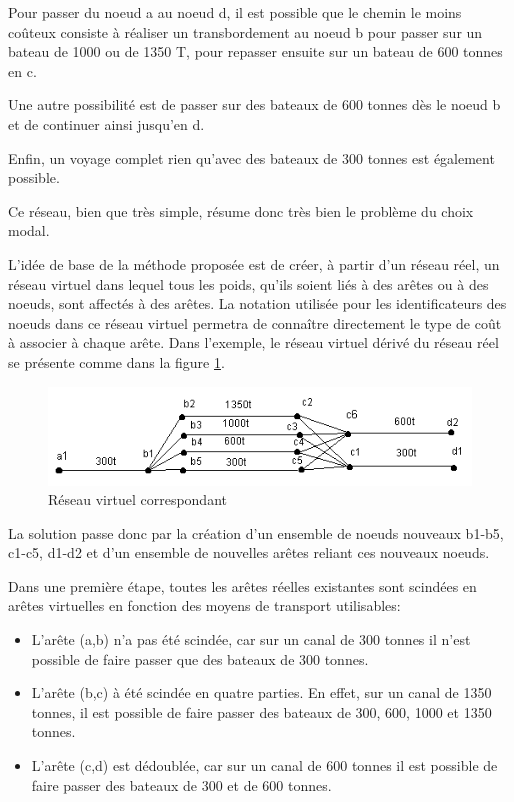 Pour passer du noeud a au noeud d, il est possible que le chemin le
moins coûteux consiste à réaliser un transbordement au noeud b pour
passer sur un bateau de 1000 ou de 1350 T, pour repasser ensuite
sur un bateau de 600 tonnes en c.

Une autre possibilité est de passer sur des bateaux de 600 tonnes
dès le noeud b et de continuer ainsi jusqu'en d.

Enfin, un voyage complet rien qu'avec des bateaux de 300 tonnes est
également possible.

Ce réseau, bien que très simple, résume donc très bien le problème
du choix modal.


L'idée de base de la méthode proposée est de créer, à partir d'un réseau réel,
un réseau virtuel dans lequel tous les poids, qu'ils soient liés à des arêtes ou
à des noeuds, sont affectés à des arêtes. La notation utilisée pour les
identificateurs des noeuds dans ce réseau virtuel permetra de connaître
directement le type de coût à associer à chaque arête. Dans l'exemple, le réseau
virtuel dérivé du réseau réel se présente comme dans la figure \ref{f3_2}.

\begin{figure}[htbp]
\centerline{\includegraphics[width=12cm]{f3_2.png}}
\caption{\label{f3_2} R\'eseau virtuel correspondant}
\end{figure}

La solution passe donc par la création d'un ensemble de noeuds nouveaux b1-b5,
c1-c5, d1-d2 et d'un ensemble de nouvelles arêtes reliant ces nouveaux noeuds.

Dans une première étape, toutes les arêtes réelles existantes sont
scindées en arêtes virtuelles en fonction des moyens de transport
utilisables:

\begin{itemize}

\item L'arête (a,b) n'a pas été scindée, car sur un canal de 300 tonnes il
n'est possible de faire passer que des bateaux de 300 tonnes.
\item L'arête (b,c) à été scindée en quatre parties. En effet, sur un canal de
1350 tonnes, il est possible de faire passer des bateaux de 300,
600, 1000 et 1350 tonnes.
\item  L'arête (c,d) est dédoublée, car sur un canal de 600 tonnes il est possible
de faire passer des bateaux de 300 et de 600 tonnes.
\end{itemize}

